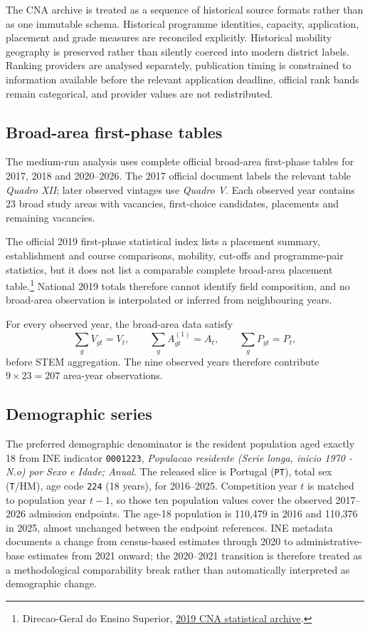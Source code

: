 \documentclass[11pt,a4paper]{article}
\begin{document}
The CNA archive is treated as a sequence of historical source formats rather than as one immutable schema. Historical programme identities, capacity, application, placement and grade measures are reconciled explicitly. Historical mobility geography is preserved rather than silently coerced into modern district labels. Ranking providers are analysed separately, publication timing is constrained to information available before the relevant application deadline, official rank bands remain categorical, and provider values are not redistributed.

\subsection{Broad-area first-phase tables}
The medium-run analysis uses complete official broad-area first-phase tables for 2017, 2018 and 2020--2026. The 2017 official document labels the relevant table \emph{Quadro XII}; later observed vintages use \emph{Quadro V}. Each observed year contains 23 broad study areas with vacancies, first-choice candidates, placements and remaining vacancies.

The official 2019 first-phase statistical index lists a placement summary, establishment and course comparisons, mobility, cut-offs and programme-pair statistics, but it does not list a comparable complete broad-area placement table.\footnote{Direcao-Geral do Ensino Superior, \href{https://www.dges.gov.pt/guias/pdfs/statcol/2019/}{2019 CNA statistical archive}.} National 2019 totals therefore cannot identify field composition, and no broad-area observation is interpolated or inferred from neighbouring years.

For every observed year, the broad-area data satisfy
\[
\sum_g V_{gt}=V_t,\qquad
\sum_g A^{(1)}_{gt}=A_t,\qquad
\sum_g P_{gt}=P_t,
\]
before STEM aggregation. The nine observed years therefore contribute $9\times23=207$ area-year observations.

\subsection{Demographic series}
The preferred demographic denominator is the resident population aged exactly 18 from INE indicator \texttt{0001223}, \emph{Populacao residente (Serie longa, inicio 1970 - N.o) por Sexo e Idade; Anual}. The released slice is Portugal (\texttt{PT}), total sex (\texttt{T}/HM), age code \texttt{224} (18 years), for 2016--2025. Competition year $t$ is matched to population year $t-1$, so those ten population values cover the observed 2017--2026 admission endpoints. The age-18 population is 110,479 in 2016 and 110,376 in 2025, almost unchanged between the endpoint references. INE metadata documents a change from census-based estimates through 2020 to administrative-base estimates from 2021 onward; the 2020--2021 transition is therefore treated as a methodological comparability break rather than automatically interpreted as demographic change.
\end{document}
